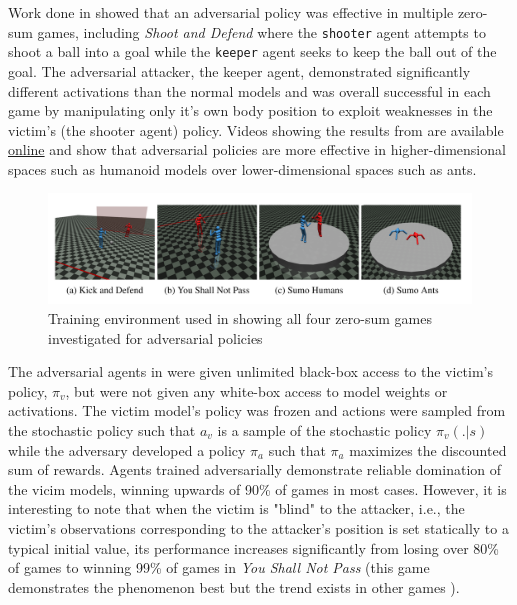 \documentclass{article}
\begin{document}
\noindent 
Work done in \cite{Gleave2019} showed that an adversarial policy was effective in multiple zero-sum games, including \textit{Shoot and Defend} where the \texttt{shooter} agent attempts to shoot a ball into a goal while the \texttt{keeper} agent seeks to keep the ball out of the goal. 
The adversarial attacker, the keeper agent, demonstrated significantly different activations than the normal models and was overall successful in each game by manipulating only it's own body position to exploit weaknesses in the victim's (the shooter agent) policy.
Videos showing the results from \cite{Gleave2019} are available \href{https://adversarialpolicies.github.io/}{online} and show that adversarial policies are more effective in higher-dimensional spaces such as humanoid models over lower-dimensional spaces such as ants. 

\begin{figure}[h!]
  \includegraphics[width=\linewidth]{imgs/Gleave2019_env}
  \caption{Training environment used in \cite{Gleave2019} showing all four zero-sum games investigated for adversarial policies}
  \label{fig:gleave_env}
\end{figure}

\noindent 
The adversarial agents in \cite{Gleave2019} were given unlimited black-box access to the victim's policy, $\pi_v$, but were not given any white-box access to model weights or activations. 
The victim model's policy was frozen and actions were sampled from the stochastic policy such that $a_v$ is a sample of the stochastic policy $\pi_v(. | s)$ while the adversary developed a policy $\pi_a$ such that $\pi_a$ maximizes the discounted sum of rewards. 
Agents trained adversarially demonstrate reliable domination of the vicim models, winning upwards of 90\% of games in most cases. 
However, it is interesting to note that when the victim is "blind" to the attacker, i.e., the victim's observations corresponding to the attacker's position is set statically to a typical initial value, its performance increases significantly from losing over 80\% of games to winning 99\% of games in \textit{You Shall Not Pass} (this game demonstrates the phenomenon best but the trend exists in other games \cite{Gleave2019} ). 
\end{document}
